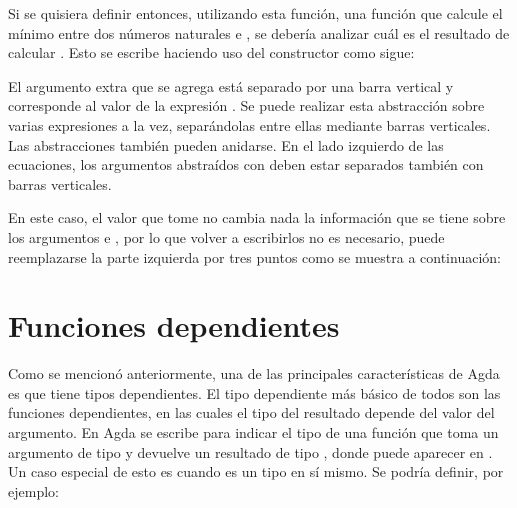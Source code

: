 
Si se quisiera definir entonces, utilizando esta función, una función  que calcule el mínimo entre dos números naturales  e , se debería analizar cuál es el resultado de calcular  \AgdaFunction{<} . Esto se escribe haciendo uso del constructor  como sigue:


El argumento extra que se agrega está separado por una barra vertical y corresponde al valor de la expresión  \AgdaFunction{<} . Se puede realizar esta abstracción sobre varias expresiones a la vez, separándolas entre ellas mediante barras verticales. Las abstracciones  también pueden anidarse. En el lado izquierdo de las ecuaciones, los argumentos abstraídos con  deben estar separados también con barras verticales. 

En este caso, el valor que tome  \AgdaFunction{<}  no cambia nada la información que se tiene sobre los argumentos  e , por lo que volver a escribirlos no es necesario, puede reemplazarse la parte izquierda por tres puntos como se muestra a continuación:


\section{Funciones dependientes}\label{dependent}

Como se mencionó anteriormente, una de las principales características de Agda es que tiene tipos dependientes. El tipo dependiente más básico de todos son las funciones dependientes, en las cuales el tipo del resultado depende del valor del argumento. En Agda se escribe \AgdaSymbol{(} \AgdaSymbol{:} \AgdaSymbol{)} \AgdaSymbol{$\rightarrow$}  para indicar el tipo de una función que toma un argumento  de tipo  y devuelve un resultado de tipo , donde  puede aparecer en . Un caso especial de esto es cuando  es un tipo en sí mismo. Se podría definir, por ejemplo:


